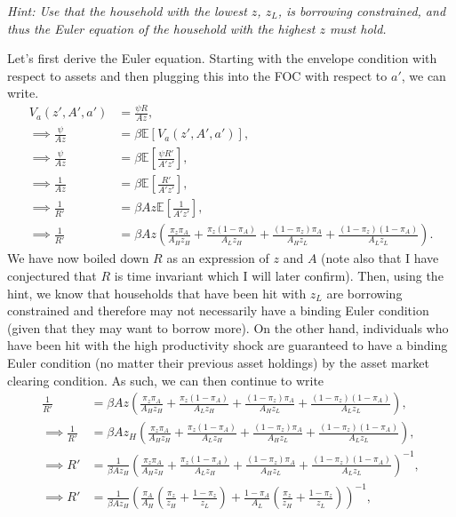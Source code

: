 \documentclass[11pt,english]{article}
\begin{document}
\begin{enumerate}
        \noindent\textit{Hint: Use that the household with the lowest $z$,
        $z_L$, is borrowing constrained, and thus the Euler equation of the
        household with the highest $z$ must hold.}
    \begin{solution}
 	Let's first derive the Euler equation. Starting with the envelope condition with respect to assets and then plugging this into the FOC with respect to $a'$, we can write.
\begin{align*}
V_a(z', A', a') &= \frac{\psi R}{Az},\\
\implies \frac{\psi}{Az}&= \beta \mathbb{E}[V_a(z', A', a')],\\
\implies \frac{\psi}{Az}&= \beta \mathbb{E}\left[\frac{\psi R'}{A'z'}\right],\\
\implies \frac{1}{Az}&= \beta \mathbb{E}\left[\frac{R'}{A'z'}\right],\\
\implies \frac{1}{R'} &= \beta Az\mathbb{E}\left[\frac{1}{A'z'}\right],\\
\implies \frac{1}{R'} &= \beta Az\left(\frac{\pi_z\pi_A}{A_Hz_H} + \frac{\pi_z(1-\pi_A)}{A_Lz_H} + \frac{(1-\pi_z)\pi_A}{A_Hz_L} + \frac{(1-\pi_z)(1-\pi_A)}{A_Lz_L}\right).
\end{align*}
We have now boiled down $R$ as an expression of $z$ and $A$ (note also that I have conjectured that $R$ is time invariant which I will later confirm). Then, using the hint, we know that households that have been hit with $z_L$ are borrowing constrained and therefore may not necessarily have a binding Euler condition (given that they may want to borrow more). On the other hand, individuals who have been hit with the high productivity shock are guaranteed to have a binding Euler condition (no matter their previous asset holdings) by the asset market clearing condition. As such, we can then continue to write
\begin{align*}
\frac{1}{R'} &= \beta Az\left(\frac{\pi_z\pi_A}{A_Hz_H} + \frac{\pi_z(1-\pi_A)}{A_Lz_H} + \frac{(1-\pi_z)\pi_A}{A_Hz_L} + \frac{(1-\pi_z)(1-\pi_A)}{A_Lz_L}\right),\\
\implies \frac{1}{R'} &= \beta Az_H\left(\frac{\pi_z\pi_A}{A_Hz_H} + \frac{\pi_z(1-\pi_A)}{A_Lz_H} + \frac{(1-\pi_z)\pi_A}{A_Hz_L} + \frac{(1-\pi_z)(1-\pi_A)}{A_Lz_L}\right),\\
\implies R' &= \frac{1}{\beta A z_H}\left(\frac{\pi_z\pi_A}{A_Hz_H} + \frac{\pi_z(1-\pi_A)}{A_Lz_H} + \frac{(1-\pi_z)\pi_A}{A_Hz_L} + \frac{(1-\pi_z)(1-\pi_A)}{A_Lz_L}\right)^{-1},\\
\implies R' &= \frac{1}{\beta A z_H}\left(\frac{\pi_A}{A_H}\left(\frac{\pi_z}{z_H} + \frac{1-\pi_z}{z_L}\right) + \frac{1 - \pi_A}{A_L}\left(\frac{\pi_z}{z_H} + \frac{1-\pi_z}{z_L}\right)\right)^{-1},\\

\end{align*}
\end{solution}
\end{enumerate}
\end{document}
